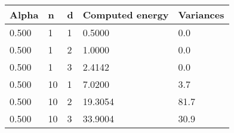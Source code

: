 \documentclass{article}
\begin{document}
\begin{longtable}[]{@{}lllll@{}}
\toprule
Alpha & n & d & Computed energy & Variances\tabularnewline
\midrule
\endhead
0.500 & 1 & 1 & 0.5000 & 0.0\tabularnewline
0.500 & 1 & 2 & 1.0000 & 0.0\tabularnewline
0.500 & 1 & 3 & 2.4142 & 0.0\tabularnewline
0.500 & 10 & 1 & 7.0200 & 3.7\tabularnewline
0.500 & 10 & 2 & 19.3054 & 81.7\tabularnewline
0.500 & 10 & 3 & 33.9004 & 30.9\tabularnewline
\bottomrule
\end{longtable}
\end{document}

